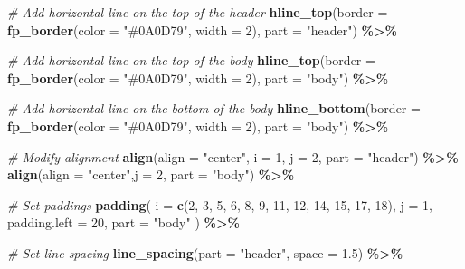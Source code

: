 \documentclass[
]{article}
\newenvironment{Shaded}{\begin{snugshade}}{\end{snugshade}}
\newcommand{\AttributeTok}[1]{\textcolor[rgb]{0.13,0.29,0.53}{#1}}
\newcommand{\CommentTok}[1]{\textcolor[rgb]{0.56,0.35,0.01}{\textit{#1}}}
\newcommand{\DecValTok}[1]{\textcolor[rgb]{0.00,0.00,0.81}{#1}}
\newcommand{\FloatTok}[1]{\textcolor[rgb]{0.00,0.00,0.81}{#1}}
\newcommand{\FunctionTok}[1]{\textcolor[rgb]{0.13,0.29,0.53}{\textbf{#1}}}
\newcommand{\NormalTok}[1]{#1}
\newcommand{\SpecialCharTok}[1]{\textcolor[rgb]{0.81,0.36,0.00}{\textbf{#1}}}
\newcommand{\StringTok}[1]{\textcolor[rgb]{0.31,0.60,0.02}{#1}}
\begin{document}
\begin{Shaded}
\begin{Highlighting}[]
  \CommentTok{\# Add horizontal line on the top of the header}
  \FunctionTok{hline\_top}\NormalTok{(}\AttributeTok{border =} \FunctionTok{fp\_border}\NormalTok{(}\AttributeTok{color =} \StringTok{"\#0A0D79"}\NormalTok{, }\AttributeTok{width =} \DecValTok{2}\NormalTok{), }\AttributeTok{part =} \StringTok{"header"}\NormalTok{) }\SpecialCharTok{\%\textgreater{}\%}
  
  \CommentTok{\# Add horizontal line on the top of the body}
  \FunctionTok{hline\_top}\NormalTok{(}\AttributeTok{border =} \FunctionTok{fp\_border}\NormalTok{(}\AttributeTok{color =} \StringTok{"\#0A0D79"}\NormalTok{, }\AttributeTok{width =} \DecValTok{2}\NormalTok{), }\AttributeTok{part =} \StringTok{"body"}\NormalTok{) }\SpecialCharTok{\%\textgreater{}\%}
  
  \CommentTok{\# Add horizontal line on the bottom of the body}
  \FunctionTok{hline\_bottom}\NormalTok{(}\AttributeTok{border =} \FunctionTok{fp\_border}\NormalTok{(}\AttributeTok{color =} \StringTok{"\#0A0D79"}\NormalTok{, }\AttributeTok{width =} \DecValTok{2}\NormalTok{), }\AttributeTok{part =} \StringTok{"body"}\NormalTok{) }\SpecialCharTok{\%\textgreater{}\%}
  
  \CommentTok{\# Modify alignment}
  \FunctionTok{align}\NormalTok{(}\AttributeTok{align =} \StringTok{"center"}\NormalTok{, }\AttributeTok{i =} \DecValTok{1}\NormalTok{, }\AttributeTok{j =} \DecValTok{2}\NormalTok{, }\AttributeTok{part =} \StringTok{"header"}\NormalTok{) }\SpecialCharTok{\%\textgreater{}\%}
  \FunctionTok{align}\NormalTok{(}\AttributeTok{align =} \StringTok{"center"}\NormalTok{,}\AttributeTok{j =} \DecValTok{2}\NormalTok{, }\AttributeTok{part =} \StringTok{"body"}\NormalTok{) }\SpecialCharTok{\%\textgreater{}\%}
  
  \CommentTok{\# Set paddings}
  \FunctionTok{padding}\NormalTok{(}
    \AttributeTok{i =} \FunctionTok{c}\NormalTok{(}\DecValTok{2}\NormalTok{, }\DecValTok{3}\NormalTok{, }\DecValTok{5}\NormalTok{, }\DecValTok{6}\NormalTok{, }\DecValTok{8}\NormalTok{, }\DecValTok{9}\NormalTok{, }\DecValTok{11}\NormalTok{, }\DecValTok{12}\NormalTok{, }\DecValTok{14}\NormalTok{, }\DecValTok{15}\NormalTok{, }\DecValTok{17}\NormalTok{, }\DecValTok{18}\NormalTok{),}
    \AttributeTok{j =} \DecValTok{1}\NormalTok{,}
    \AttributeTok{padding.left =} \DecValTok{20}\NormalTok{,}
    \AttributeTok{part =} \StringTok{"body"}
\NormalTok{  ) }\SpecialCharTok{\%\textgreater{}\%}
  
  \CommentTok{\# Set line spacing}
  \FunctionTok{line\_spacing}\NormalTok{(}\AttributeTok{part =} \StringTok{"header"}\NormalTok{, }\AttributeTok{space =} \FloatTok{1.5}\NormalTok{) }\SpecialCharTok{\%\textgreater{}\%}
  

\end{Highlighting}
\end{Shaded}
\end{document}
